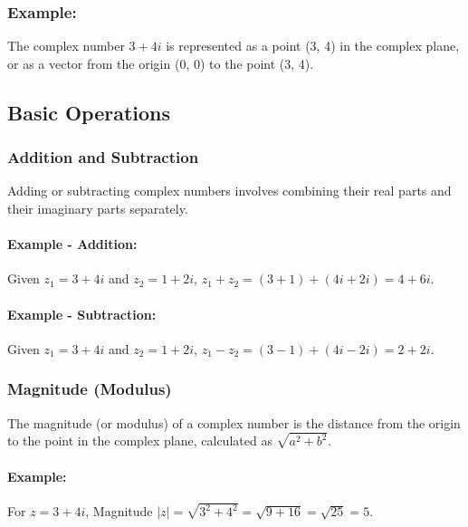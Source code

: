 \documentclass[
]{article}
\begin{document}
\subsubsection{Example:}\label{example-1}

The complex number \(3 + 4i\) is represented as a point (3, 4) in the
complex plane, or as a vector from the origin (0, 0) to the point (3,
4).

\subsection{Basic Operations}\label{basic-operations}

\subsubsection{Addition and Subtraction}\label{addition-and-subtraction}

Adding or subtracting complex numbers involves combining their real
parts and their imaginary parts separately.

\paragraph{Example - Addition:}\label{example---addition}

Given \(z_1 = 3 + 4i\) and \(z_2 = 1 + 2i\),
\(z_1 + z_2 = (3 + 1) + (4i + 2i) = 4 + 6i\).

\paragraph{Example - Subtraction:}\label{example---subtraction}

Given \(z_1 = 3 + 4i\) and \(z_2 = 1 + 2i\),
\(z_1 - z_2 = (3 - 1) + (4i - 2i) = 2 + 2i\).

\subsubsection{Magnitude (Modulus)}\label{magnitude-modulus}

The magnitude (or modulus) of a complex number is the distance from the
origin to the point in the complex plane, calculated as
\(\sqrt{a^2 + b^2}\).

\paragraph{Example:}\label{example-2}

For \(z = 3 + 4i\), Magnitude
\(|z| = \sqrt{3^2 + 4^2} = \sqrt{9 + 16} = \sqrt{25} = 5\).
\end{document}
